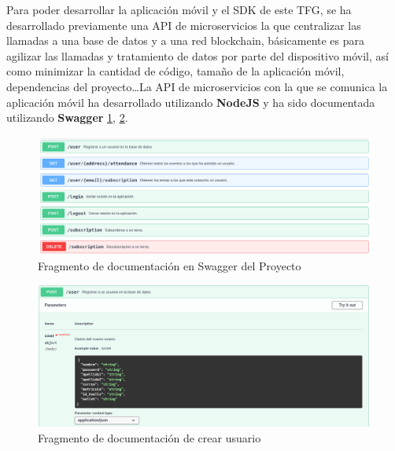 Para poder desarrollar la aplicación móvil y el SDK de este TFG, se ha desarrollado previamente una API de microservicios la que centralizar las llamadas a una base de datos y a una red blockchain, básicamente es para agilizar las llamadas y tratamiento de datos por parte del dispositivo móvil, así como minimizar la cantidad de código, tamaño de la aplicación móvil, dependencias del proyecto\dots La API de microservicios con la que se comunica la aplicación móvil ha desarrollado utilizando \textbf{NodeJS} y ha sido documentada utilizando \textbf{Swagger} \ref{fig:swaggerQuerys}, \ref{fig:swaggerUsuario}. \\

\begin{figure}[h!]
  \centering
  \includegraphics[width=1\linewidth]{figs/Desarrollo/Swagger}
  \caption[Swagger]{Fragmento de documentación en Swagger del Proyecto}
  \label{fig:swaggerQuerys}
\end{figure}

\begin{figure}[h!]
  \centering
  \includegraphics[width=1\linewidth]{figs/Desarrollo/SwaggerUsuario}
  \caption[Swagger Usuario]{Fragmento de documentación de crear usuario}
  \label{fig:swaggerUsuario}
\end{figure}


